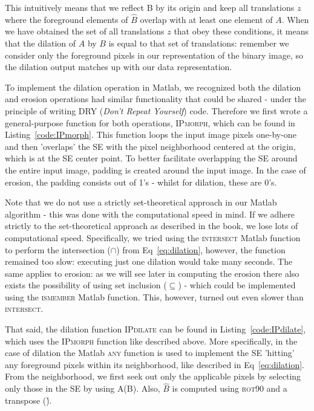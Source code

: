 \documentclass{article}
\begin{document}
This intuitively means that we reflect B by its origin and keep all translations $z$ where the foreground elements of $\hat{B}$ overlap with at least one element of $A$. When we have obtained the set of all translations $z$ that obey these conditions, it means that the dilation of $A$ by $B$ is equal to that set of translations: remember we consider only the foreground pixels in our representation of the binary image, so the dilation output matches up with our data representation.

To implement the dilation operation in Matlab, we recognized both the dilation and erosion operations had similar functionality that could be shared - under the principle of writing DRY (\textit{Don't Repeat Yourself}) code. Therefore we first wrote a general-purpose function for both operations, \textsc{IPmorph}, which can be found in  Listing~\ref{code:IPmorph}. This function loops the input image pixels one-by-one and then 'overlaps' the SE with the pixel neighborhood centered at the origin, which is at the SE center point. To better facilitate overlapping the SE around the entire input image, padding is created around the input image. In the case of erosion, the padding consists out of 1's - whilst for dilation, these are 0's.

Note that we do not use a strictly set-theoretical approach in our Matlab algorithm - this was done with the computational speed in mind. If we adhere strictly to the set-theoretical approach as described in the book, we lose lots of computational speed. Specifically, we tried using the \textsc{intersect} Matlab function to perform the intersection ($\cap$) from Eq~\ref{eq:dilation}, however, the function remained too slow: executing just one dilation would take many seconds. The same applies to erosion: as we will see later in computing the erosion there also exists the possibility of using set inclusion ($\subseteq$) - which could be implemented using the \textsc{ismember} Matlab function. This, however, turned out even slower than \textsc{intersect}.

That said, the dilation function \textsc{IPdilate} can be found in  Listing~\ref{code:IPdilate}, which uses the \textsc{IPmorph} function like described above. More specifically, in the case of dilation the Matlab \textsc{any} function is used to implement the SE 'hitting' any foreground pixels within its neighborhood, like described in Eq~\ref{eq:dilation}. From the neighborhood, we first seek out only the applicable pixels by selecting only those in the SE by using \textsc{A(B)}.  Also, $\hat{B}$ is computed using \textsc{rot90} and a transpose (\').
\end{document}
